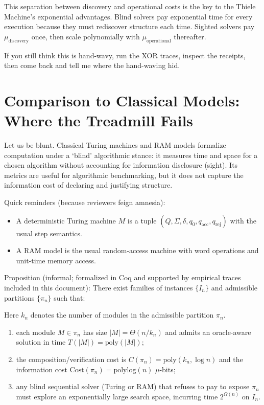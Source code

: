 \documentclass[11pt]{article}
\begin{document}
This separation between discovery and operational costs is the key to the Thiele Machine's exponential advantages. Blind solvers pay exponential time for every execution because they must rediscover structure each time. Sighted solvers pay $\mu_{\text{discovery}}$ once, then scale polynomially with $\mu_{\text{operational}}$ thereafter.

If you still think this is hand-wavy, run the XOR traces, inspect the receipts, then come back and tell me where the hand-waving hid.

\section{Comparison to Classical Models: Where the Treadmill Fails}
Let us be blunt. Classical Turing machines and RAM models formalize computation under a `blind' algorithmic stance: it measures time and space for a chosen algorithm without accounting for information disclosure (sight). Its metrics are useful for algorithmic benchmarking, but it does not capture the information cost of declaring and justifying structure.

Quick reminders (because reviewers feign amnesia):
\begin{itemize}
  \item A deterministic Turing machine $M$ is a tuple $(Q,\Sigma,\delta,q_0,q_{\text{acc}},q_{\text{rej}})$ with the usual step semantics.
  \item A RAM model is the usual random-access machine with word operations and unit-time memory access.
\end{itemize}

Proposition (informal; formalized in Coq and supported by empirical traces included in this document):
There exist families of instances $\{I_n\}$ and admissible partitions $\{\pi_n\}$ such that:

Here $k_n$ denotes the number of modules in the admissible partition $\pi_n$.

\begin{enumerate}
  \item each module $M\in\pi_n$ has size $|M|=\Theta(n/k_n)$ and admits an oracle-aware solution in time $T(|M|)=\mathrm{poly}(|M|)$;
  \item the composition/verification cost is $C(\pi_n)=\mathrm{poly}(k_n,\log n)$ and the information cost \(\mathrm{Cost}(\pi_n)=\mathrm{polylog}(n)\) \(\mu\)-bits;
  \item any blind sequential solver (Turing or RAM) that refuses to pay to expose $\pi_n$ must explore an exponentially large search space, incurring time $2^{\Omega(n)}$ on $I_n$.
\end{enumerate}
\end{document}
